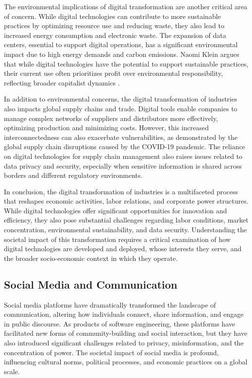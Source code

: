 \begin{refsection}
The environmental implications of digital transformation are another critical area of concern. While digital technologies can contribute to more sustainable practices by optimizing resource use and reducing waste, they also lead to increased energy consumption and electronic waste. The expansion of data centers, essential to support digital operations, has a significant environmental impact due to high energy demands and carbon emissions. Naomi Klein argues that while digital technologies have the potential to support sustainable practices, their current use often prioritizes profit over environmental responsibility, reflecting broader capitalist dynamics \cite[pp.~384-386]{klein2021this}.

In addition to environmental concerns, the digital transformation of industries also impacts global supply chains and trade. Digital tools enable companies to manage complex networks of suppliers and distributors more effectively, optimizing production and minimizing costs. However, this increased interconnectedness can also exacerbate vulnerabilities, as demonstrated by the global supply chain disruptions caused by the COVID-19 pandemic. The reliance on digital technologies for supply chain management also raises issues related to data privacy and security, especially when sensitive information is shared across borders and different regulatory environments.

In conclusion, the digital transformation of industries is a multifaceted process that reshapes economic activities, labor relations, and corporate power structures. While digital technologies offer significant opportunities for innovation and efficiency, they also pose substantial challenges regarding labor conditions, market concentration, environmental sustainability, and data security. Understanding the societal impact of this transformation requires a critical examination of how digital technologies are developed and deployed, whose interests they serve, and the broader socio-economic context in which they operate.

\subsection{Social Media and Communication}

Social media platforms have dramatically transformed the landscape of communication, altering how individuals connect, share information, and engage in public discourse. As products of software engineering, these platforms have facilitated new forms of community-building and social interaction, but they have also introduced significant challenges related to privacy, misinformation, and the concentration of power. The societal impact of social media is profound, influencing cultural norms, political processes, and economic practices on a global scale.


\end{refsection}
